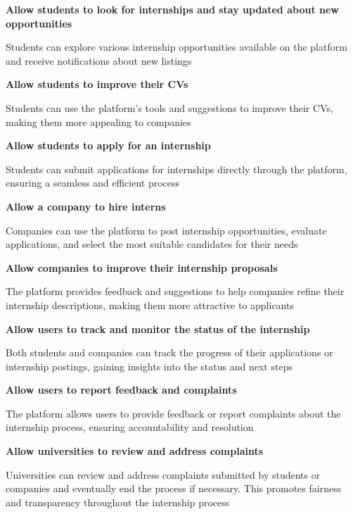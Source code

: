 \begin{goalist}
    \item \textbf{Allow students to look for internships and stay updated about new opportunities}
    
        Students can explore various internship opportunities available on the platform and receive notifications about new listings
    
    \itemgb \textbf{Allow students to improve their CVs}
    
        Students can use the platform’s tools and suggestions to improve their CVs, making them more appealing to companies 
    
    \itemgc \textbf{Allow students to apply for an internship}
    
        Students can submit applications for internships directly through the platform, ensuring a seamless and efficient process 
    
    \itemgd \textbf{Allow a company to hire interns}
    
        Companies can use the platform to post internship opportunities, evaluate applications, and select the most suitable candidates for their needs 
    
    \itemge \textbf{Allow companies to improve their internship proposals}
    
        The platform provides feedback and suggestions to help companies refine their internship descriptions, making them more attractive to applicants 
   
    \itemgf \textbf{Allow users to track and monitor the status of the internship}
    
        Both students and companies can track the progress of their applications or internship postings, gaining insights into the status and next steps 
    
    \itemgg \textbf{Allow users to report feedback and complaints}
    
        The platform allows users to provide feedback or report complaints about the internship process, ensuring accountability and resolution 
    
    \itemgh \textbf{Allow universities to review and address complaints}
    
       Universities can review and address complaints submitted by students or companies and eventually end the process if necessary. This promotes fairness and transparency throughout the internship process 

\end{goalist}

